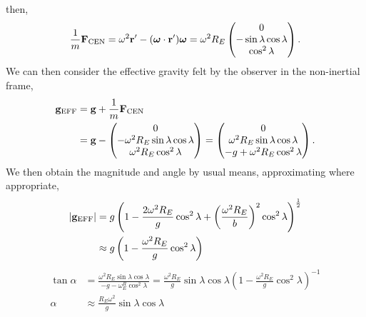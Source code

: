 \documentclass{book}
\begin{document}
then,
\begin{equation}
    \frac{1}{m}\vb{F}_{\text{CEN}} = \omega^2\vb{r}' - (\vb*{\omega}\cdot\vb{r}')\vb*{\omega} = \omega^2R_E\begin{pmatrix}
        0 \\
        -\sin\lambda\cos\lambda \\
        \cos^2\lambda
    \end{pmatrix}.
\end{equation}
We can then consider the effective gravity felt by the observer in the non-inertial frame,
\begin{equation}
\begin{split}
    \vb{g}_{\text{EFF}} &= \vb{g} + \frac{1}{m}\vb{F}_{\text{CEN}}\\
    & = \vb{g} - \begin{pmatrix}
        0 \\
        -\omega^2R_E\sin\lambda\cos\lambda \\
        \omega^2R_E\cos^2\lambda
    \end{pmatrix} = \begin{pmatrix}
        0 \\
        \omega^2R_E\sin\lambda\cos\lambda \\
        -g + \omega^2R_E\cos^2\lambda
    \end{pmatrix}.
\end{split}
\end{equation}
We then obtain the magnitude and angle by usual means, approximating where appropriate,
\begin{equation}
\begin{split}
    |\vb{g}_{\text{EFF}}| &= g\left(1 - \frac{2\omega^2R_E}{g}\cos^2\lambda + \left(\frac{\omega^2R_E}{b}\right)^2\cos^2\lambda\right)^{\frac{1}{2}} \\
    & \approx g\left(1-\frac{\omega^2R_E}{g}\cos^2\lambda\right)
\end{split}
\end{equation}
\begin{equation}
\begin{split}
    \tan\alpha & = \frac{\omega^2R_E\sin\lambda\cos\lambda}{-g-\omega^R_E\cos^2\lambda} = \frac{\omega^2R_E}{g}\sin\lambda\cos\lambda\left(1-\frac{\omega^2R_E}{g}\cos^2\lambda\right)^{-1} \\
    \alpha & \approx \frac{R_E\omega^2}{g}\sin\lambda\cos\lambda
\end{split}
\end{equation}
\end{document}
